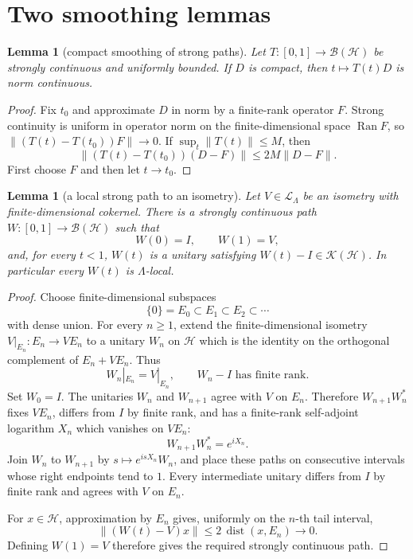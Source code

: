 \documentclass[11pt]{article}
\newtheorem{lemma}[theorem]{Lemma}
\newcommand{\HH}{\mathcal H}
\newcommand{\KK}{\mathcal K}
\newcommand{\LL}{\mathcal L}
\newcommand{\BB}{\mathcal B}
\newcommand{\Ran}{\operatorname{Ran}}
\begin{document}
\section{Two smoothing lemmas}

\begin{lemma}[compact smoothing of strong paths]\label{lem:smoothing}
Let \(T:[0,1]\to\BB(\HH)\) be strongly continuous and uniformly bounded.
If \(D\) is compact, then \(t\mapsto T(t)D\) is norm continuous.
\end{lemma}

\begin{proof}
Fix \(t_0\) and approximate \(D\) in norm by a finite-rank operator \(F\).
Strong continuity is uniform in operator norm on the finite-dimensional
space \(\Ran F\), so
\(\|(T(t)-T(t_0))F\|\to0\).  If
\(\sup_t\|T(t)\|\leq M\), then
\[
 \|(T(t)-T(t_0))(D-F)\|\leq2M\|D-F\|.
\]
First choose \(F\) and then let \(t\to t_0\).
\end{proof}

\begin{lemma}[a local strong path to an isometry]\label{lem:strong}
Let \(V\in\LL_\Lambda\) be an isometry with finite-dimensional cokernel.
There is a strongly continuous path \(W:[0,1]\to\BB(\HH)\) such that
\[
 W(0)=I,\qquad W(1)=V,
\]
and, for every \(t<1\), \(W(t)\) is a unitary satisfying
\(W(t)-I\in\KK(\HH)\).  In particular every \(W(t)\) is
\(\Lambda\)-local.
\end{lemma}

\begin{proof}
Choose finite-dimensional subspaces
\[
 \{0\}=E_0\subset E_1\subset E_2\subset\cdots
\]
with dense union.  For every \(n\geq1\), extend the finite-dimensional
isometry \(V|_{E_n}:E_n\to VE_n\) to a unitary \(W_n\) on \(\HH\) which is
the identity on the orthogonal complement of \(E_n+VE_n\).  Thus
\[
 W_n|_{E_n}=V|_{E_n},\qquad W_n-I\text{ has finite rank}.
\]
Set \(W_0=I\).  The unitaries \(W_n\) and \(W_{n+1}\) agree with \(V\) on
\(E_n\).  Therefore \(W_{n+1}W_n^*\) fixes \(VE_n\), differs from \(I\)
by finite rank, and has a finite-rank self-adjoint logarithm \(X_n\) which
vanishes on \(VE_n\):
\[
 W_{n+1}W_n^*=e^{iX_n}.
\]
Join \(W_n\) to \(W_{n+1}\) by
\(s\mapsto e^{isX_n}W_n\), and place these paths on consecutive intervals
whose right endpoints tend to \(1\).  Every intermediate unitary differs
from \(I\) by finite rank and agrees with \(V\) on \(E_n\).

For \(x\in\HH\), approximation by \(E_n\) gives, uniformly on the
\(n\)-th tail interval,
\[
 \|(W(t)-V)x\|\leq2\,\operatorname{dist}(x,E_n)\longrightarrow0.
\]
Defining \(W(1)=V\) therefore gives the required strongly continuous path.
\end{proof}
\end{document}
